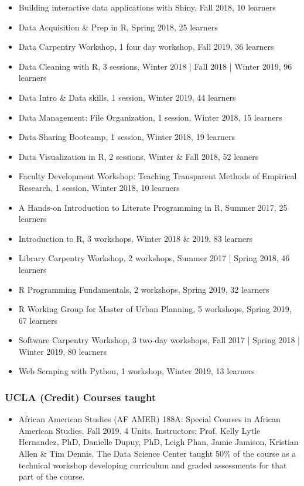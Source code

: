 \begin{itemize}[label={}, leftmargin=!,labelindent=5pt,itemindent=-15pt]
  \item Building interactive data applications with Shiny, Fall 2018,	10 learners
  \item Data Acquisition \& Prep in R, Spring 2018, 25 learners
  \item Data Carpentry Workshop, 1 four day workshop, Fall 2019,	36 learners
  \item Data Cleaning with R,	3 sessions,	Winter 2018 | Fall 2018 | Winter 2019, 96 learners
  \item Data Intro \& Data skills, 1 session, Winter 2019,	44 learners
  \item Data Management: File Organization,	1 session, Winter 2018,	15 learners
  \item Data Sharing Bootcamp, 1 session, Winter 2018, 19 learners
  \item Data Visualization in R, 2 sessions, Winter \& Fall 2018, 52 leaners
  \item Faculty Development Workshop: Teaching Transparent Methods of Empirical Research, 1 session, Winter 2018,	10 learners
  \item A Hands-on Introduction to Literate Programming in R, Summer 2017, 25 learners
  \item Introduction to R, 3 workshops, Winter 2018 \& 2019, 83 learners
  \item Library Carpentry Workshop, 2 workshops, Summer 2017 | Spring 2018, 46 learners
  \item R Programming Fundamentals,	2 workshops,	Spring 2019, 32 learners
  \item R Working Group for Master of Urban Planning, 5 workshops, Spring 2019,	67 learners
  \item Software Carpentry Workshop, 3 two-day workshops, Fall 2017 | Spring 2018 | Winter 2019, 80 learners
  \item Web Scraping with Python,	1	workshop, Winter 2019, 13 learners
\end{itemize}

\subsubsection{UCLA (Credit) Courses taught}

\begin{itemize}[label={},leftmargin=!,labelindent=5pt,itemindent=-15pt]
    \item African American Studies (AF AMER) 188A: Special Courses in African American Studies. Fall 2019. 4 Units. Instructors: Prof. Kelly Lytle Hernandez, PhD, Danielle Dupuy, PhD, Leigh Phan, Jamie Jamison, Kristian Allen \& Tim Dennis. The Data Science Center taught 50\% of the course as a technical workshop developing curriculum and graded assessments for that part of the course.
\end{itemize}


